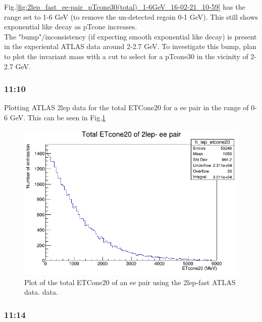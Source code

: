 Fig.\ref{fig:2lep_fast_ee-pair_pTcone30(total)_1-6GeV_16-02-21_10-59} has the range set to 1-6 GeV (to remove the un-detected regoin 0-1 GeV).  This still shows exponential like decay as pTcone increases. \\
The "bump"/inconsistency (if expecting smooth exponential like decay) is present in the experiental ATLAS data around 2-2.7 GeV.  To investigate this bump, plan to plot the invariant mass with a cut to select for a pTcone30 in the vicinity of 2-2.7 GeV.

\subsubsection*{11:10}
Plotting ATLAS 2lep data for the total ETCone20 for a ee pair in the range of 0-6 GeV.  This can be seen in Fig.\ref{fig:2lep_fast_ee-pair_ETcone30(total)_0-6GeV_16-02-21_11-11}

\begin{figure}[h!]
    \centering
    \includegraphics[width=0.85\linewidth]{plots/16-02-2021/2lep_fast_ee-pair_ETcone30(total)_0-6GeV_16-02-21_11-11}
    \caption{Plot of the total ETCone20 of an ee pair using the 2lep-fast ATLAS data.  data.}\label{fig:2lep_fast_ee-pair_ETcone30(total)_0-6GeV_16-02-21_11-11}
\end{figure}

\subsubsection*{11:14}

